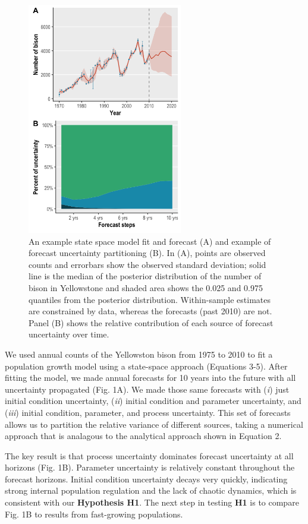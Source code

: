 \documentclass[12pt,]{article}
\begin{document}
\begin{figure}
  \centering
     \includegraphics[height=4in]{../figures/bison_combined.png}
  \caption{An example state space model fit and forecast (A) and example of forecast uncertainty partitioning (B). In (A), points are observed counts and errorbars show the observed standard deviation; solid line is the median of the posterior distribution of the number of bison in Yellowstone and shaded area shows the 0.025 and 0.975 quantiles from the posterior distribution. Within-sample estimates are constrained by data, whereas the forecasts (past 2010) are not. Panel (B) shows the relative contribution of each source of forecast uncertainty over time.}
\end{figure}

We used annual counts of the Yellowston bison from 1975 to 2010 to fit a
population growth model using a state-space approach (Equations 3-5).
After fitting the model, we made annual forecasts for 10 years into the
future with all uncertainty propagated (Fig. 1A). We made those same
forecasts with (\emph{i}) just initial condition uncertainty,
(\emph{ii}) initial condition and parameter uncertainty, and
(\emph{iii}) initial condition, parameter, and process uncertainty. This
set of forecasts allows us to partition the relative variance of
different sources, taking a numerical approach that is analagous to the
analytical approach shown in Equation 2.

The key result is that process uncertainty dominates forecast
uncertainty at all horizons (Fig. 1B). Parameter uncertainty is
relatively constant throughout the forecast horizons. Initial condition
uncertainty decays very quickly, indicating strong internal population
regulation and the lack of chaotic dynamics, which is consistent with
our \textbf{Hypothesis H1}. The next step in testing \textbf{H1} is to
compare Fig. 1B to results from fast-growing populations.
\end{document}
